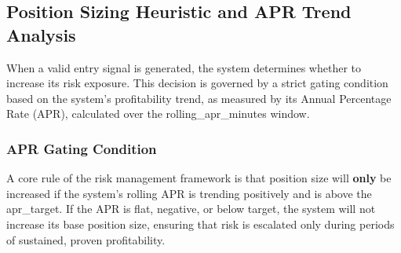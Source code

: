 \documentclass[11pt]{article}
\begin{document}
\subsection{Position Sizing Heuristic and APR Trend Analysis}
When a valid entry signal is generated, the system determines whether to increase its risk exposure. This decision is governed by a strict gating condition based on the system's profitability trend, as measured by its Annual Percentage Rate (APR), calculated over the rolling\_apr\_minutes window.

\subsubsection{APR Gating Condition}
A core rule of the risk management framework is that position size will \textbf{only} be increased if the system's rolling APR is trending positively and is above the apr\_target. If the APR is flat, negative, or below target, the system will not increase its base position size, ensuring that risk is escalated only during periods of sustained, proven profitability.
\end{document}
